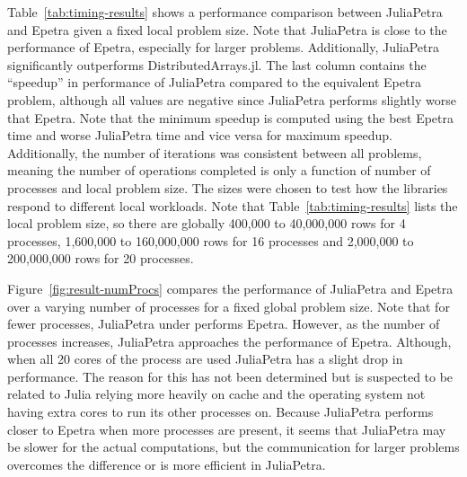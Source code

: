 \documentclass[acmsmall]{acmart}
\begin{document}
	Table~\ref{tab:timing-results} shows a performance comparison between JuliaPetra and Epetra given a fixed local problem size.
	Note that JuliaPetra is close to the performance of Epetra, especially for larger problems.
	Additionally, JuliaPetra significantly outperforms DistributedArrays.jl.
	The last column contains the ``speedup'' in performance of JuliaPetra compared to the equivalent Epetra problem, although all values are negative since JuliaPetra performs slightly worse that Epetra.
	Note that the minimum speedup is computed using the best Epetra time and worse JuliaPetra time and vice versa for maximum speedup.
	Additionally, the number of iterations was consistent between all problems, meaning the number of operations completed is only a function of number of processes and local problem size.
	The sizes were chosen to test how the libraries respond to different local workloads.
	Note that Table~\ref{tab:timing-results} lists the local problem size, so there are globally 400,000 to 40,000,000 rows for 4 processes, 1,600,000 to 160,000,000 rows for 16 processes and 2,000,000 to 200,000,000 rows for 20 processes.

	Figure~\ref{fig:result-numProcs} compares the performance of JuliaPetra and Epetra over a varying number of processes for a fixed global problem size.
	Note that for fewer processes, JuliaPetra under performs Epetra.
	However, as the number of processes increases, JuliaPetra approaches the performance of Epetra.
	Although, when all 20 cores of the process are used JuliaPetra has a slight drop in performance.
	The reason for this has not been determined but is suspected to be related to Julia relying more heavily on cache and the operating system not having extra cores to run its other processes on.
	Because JuliaPetra performs closer to Epetra when more processes are present, it seems that JuliaPetra may be slower for the actual computations, but the communication for larger problems overcomes the difference or is more efficient in JuliaPetra.
	
\end{document}
